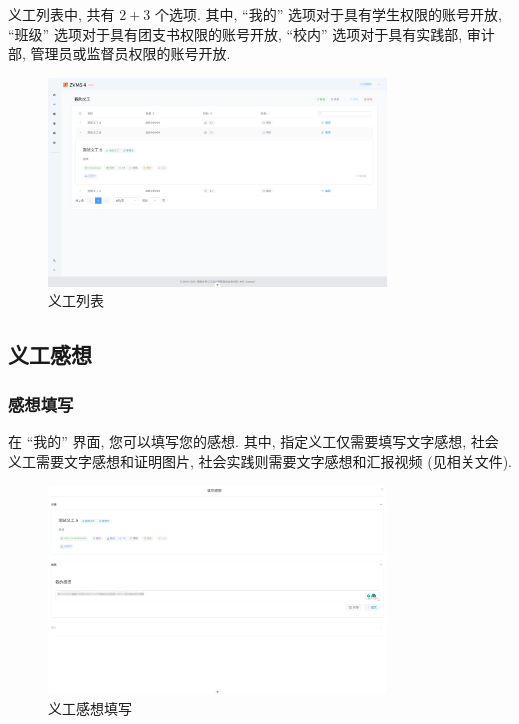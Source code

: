 \documentclass{article}
\begin{document}
义工列表中, 共有 $2 + 3$ 个选项. 其中, ``我的'' 选项对于具有学生权限的账号开放, ``班级'' 选项对于具有团支书权限的账号开放, ``校内'' 选项对于具有实践部, 审计部, 管理员或监督员权限的账号开放.

\begin{figure}[H]
  \centering
  \includegraphics[width=0.8\textwidth]{../assets/image-20240303153534228.png}
  \caption{义工列表}
  \label{fig:volunteer-list}
\end{figure}

\subsection{义工感想}

\subsubsection{感想填写}

在 ``我的'' 界面, 您可以填写您的感想. 其中, 指定义工仅需要填写文字感想, 社会义工需要文字感想和证明图片, 社会实践则需要文字感想和汇报视频 (见相关文件).

\begin{figure}[H]
  \centering
  \includegraphics[width=0.8\textwidth]{../assets/image-20240303153939095.png}
  \caption{义工感想填写}
  \label{fig:volunteer-feelings}
\end{figure}
\end{document}
